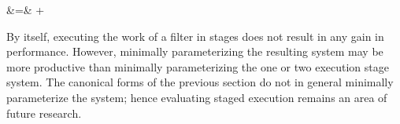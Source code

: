  &\hspace{-6pt}=\hspace{-6pt}& 
 +  
\doneeqnstar

By itself, executing the work of a filter in stages does not result in
any gain in performance. However, minimally parameterizing the
resulting system may be more productive than minimally parameterizing
the one or two execution stage system.  The canonical forms of the
previous section do not in general minimally parameterize the system;
hence evaluating staged execution remains an area of future research.
